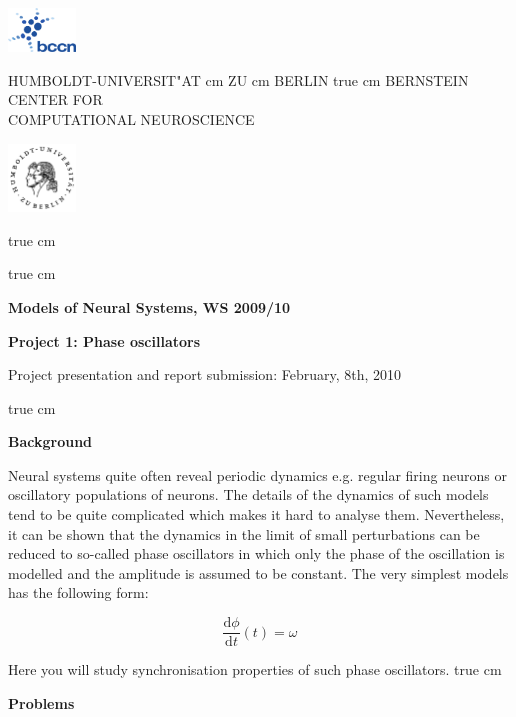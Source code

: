 \documentclass[12pt]{article}
\newcommand{\tderiv}[1]{\frac{\mathrm{d}#1}{\mathrm{d}t}}
\begin{document}
\parbox{2cm}{
\includegraphics[width=1.8cm]{../bccnlogo.pdf}
}
\parbox{11cm}{
\begin{center}
\large HUMBOLDT-UNIVERSIT"AT  cm ZU  cm BERLIN
 true cm
\mgross BERNSTEIN CENTER FOR\\ COMPUTATIONAL NEUROSCIENCE
\end{center}
}
\parbox{2cm}
{
\hfill
\includegraphics[width=1.8cm]{../hublogo.pdf}
}

 true cm



 true cm
\centerline{\bf Models of Neural Systems, WS 2009/10}
\centerline{\bf Project 1: Phase oscillators} 
\centerline{Project presentation and report submission: February,
8th, 2010}

 true cm

{\bf Background}

Neural systems quite often reveal periodic dynamics e.g. regular firing
neurons or oscillatory populations of neurons. The details of
the dynamics of such models tend to be quite complicated which makes
it hard to analyse them. Nevertheless, it can be shown that  the
dynamics  in the limit of small perturbations can be reduced to so-called phase
oscillators in which only the phase of the oscillation is modelled and
the amplitude is assumed to be constant. The very simplest models has
the following form:


\begin{equation}
    \tderiv{\phi}(t)=\omega
    \label{<++>}
\end{equation}

Here you will study synchronisation properties of such phase
oscillators.
 true cm

{\bf Problems}
\end{document}

